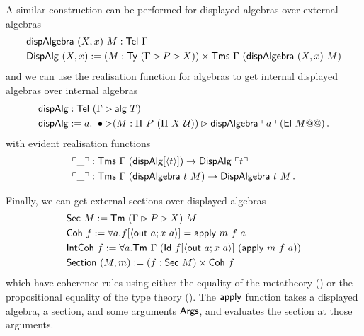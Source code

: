 
A similar construction can be performed for displayed algebras over external algebras
\begin{align*}
&\textsf{dispAlgebra}\ (X, x)\ M : \textsf{Tel}\ \Gamma \\
&\textsf{DispAlg}\ (X, x) := (M : \textsf{Ty}\ (\Gamma \rhd P \rhd X)) \times \textsf{Tms}\ \Gamma\ (\textsf{dispAlgebra}\ (X, x)\ M)
\end{align*}
and we can use the realisation function for algebras to get internal displayed
algebras over internal algebras
\begin{align*}
    &\textsf{dispAlg} : \textsf{Tel}\ (\Gamma \rhd \textsf{alg}\ T) \\
    &\textsf{dispAlg} := a.\ \bullet \rhd (M : \Pi\ P\ (\Pi\ X\ \mathcal{U})) \rhd \textsf{dispAlgebra}\ \ulcorner a \urcorner\ (\textsf{El}\ M@@) \,.
\end{align*}
with evident realisation functions
\begin{align*}
    &\ulcorner \_ \urcorner : \textsf{Tms}\ \Gamma\ (\textsf{dispAlg}[\langle t\rangle]) \to \textsf{DispAlg}\ \ulcorner t \urcorner \\
    &\ulcorner \_ \urcorner : \textsf{Tms}\ \Gamma\ (\textsf{dispAlgebra}\ t\ M) \to \textsf{DispAlgebra}\ t\ M \,.
\end{align*}

Finally, we can get external sections over displayed algebras
\begin{align*}
     &\mta{Sec}\ M := \Tm\ (\Gamma \rhd P \rhd X)\ M \\
     &\mta{Coh}\ f := \forall a. f[\Msub{\mta{out}\ a; x\ a}] = \mta{apply}\ m\ f\ a \\
     &\mta{IntCoh}\ f := \forall a. \Tm\ \Gamma\ (\mta{Id}\ f[\Msub{\mta{out}\ a; x\ a}]\ (\mta{apply}\ m\ f\ a)) \\
     &\mta{Section}\ (M, m) := (f : \mta{Sec}\ M) \times \mta{Coh}\ f
\end{align*}
which have coherence rules using either the equality of the metatheory () or
the propositional equality of the type theory ().
The $\textsf{apply}$ function takes a displayed algebra, a section, and some
arguments $\textsf{Args}$, and evaluates the section at those arguments.

